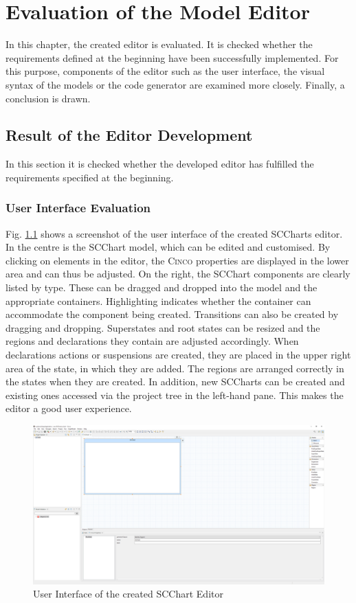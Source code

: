 \chapter{Evaluation of the Model Editor} \label{Evaluation_of_the_Model_Editor}
In this chapter, the created editor is evaluated. It is checked whether the requirements defined at the beginning have been successfully implemented. For this purpose, components of the editor such as the user interface, the visual syntax of the models or the code generator are examined more closely. Finally, a conclusion is drawn.

\section{Result of the Editor Development}
In this section it is checked whether the developed editor has fulfilled the requirements specified at the beginning.
\subsection{User Interface Evaluation}

Fig. \ref{fig:User_Interface} shows a screenshot of the user interface of the created SCCharts editor. In the centre is the SCChart model, which can be edited and customised. By clicking on elements in the editor, the \textsc{Cinco} properties are displayed in the lower area and can thus be adjusted. On the right, the SCChart components are clearly listed by type. These can be dragged and dropped into the model and the appropriate containers. Highlighting indicates whether the container can accommodate the component being created. Transitions can also be created by dragging and dropping. Superstates and root states can be resized and the regions and declarations they contain are adjusted accordingly. When declarations actions or suspensions are created, they are placed in the upper right area of the state, in which they are added. The regions are arranged correctly in the states when they are created. In addition, new SCCharts can be created and existing ones accessed via the project tree in the left-hand pane. This makes the editor a good user experience.

\begin{figure}[h!]
\centering
\includegraphics[width=1.0\textwidth]{bilder/User_Interface.png}
\caption{User Interface of the created SCChart Editor}
\label{fig:User_Interface}
\end{figure} 

